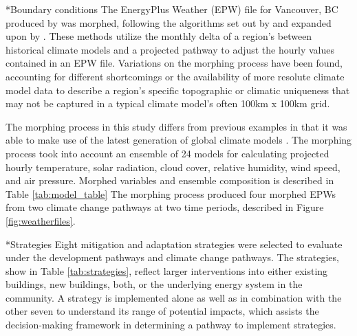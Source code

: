\documentclass[twocolumn, a4paper,10pt]{article}
\makeatletter
\renewcommand\subsection{\@startsection{subsection}{1}{\z@}{\z@}{\z@}{\normalfont\normalsize\bfseries}}
\renewcommand\subsection{\@startsection{subsection}{1}{\z@}{\z@}{0.1pt}{\normalfont\normalsize\bfseries}}
\makeatother
\begin{document}
\subsection*{Boundary conditions}
The EnergyPlus Weather (EPW) file for Vancouver, BC produced by \citet{CWEC 2016 citation} was morphed, following the algorithms set out by \citet{Belcher} and expanded upon by \citet{jentsch}. These methods utilize the monthly delta of a region's between historical climate models and a projected pathway \citep{oneil kreiglar} to adjust the hourly values contained in an EPW file. Variations on the morphing process have been found, accounting for different shortcomings or the availability of more resolute climate model data to describe a region's specific topographic or climatic uniqueness that may not be captured in a typical climate model's often 100km x 100km grid.

The morphing process in this study differs from previous examples in that it was able to make use of the latest generation of global climate models \citep{oneil tebaldi}. The morphing process took into account an ensemble of 24 models for calculating projected hourly temperature, solar radiation, cloud cover, relative humidity, wind speed, and air pressure. Morphed variables and ensemble composition is described in Table \ref{tab:model_table} The morphing process produced four morphed EPWs from two climate change pathways at two time periods, described in Figure \ref{fig:weatherfiles}.

\subsection*{Strategies}
Eight mitigation and adaptation strategies were selected to evaluate under the development pathways and climate change pathways. The strategies, show in Table \ref{tab:strategies}, reflect larger interventions into either existing buildings, new buildings, both, or the underlying energy system in the community. A strategy is implemented alone as well as in combination with the other seven to understand its range of potential impacts, which assists the decision-making framework in determining a pathway to implement strategies.
\end{document}
